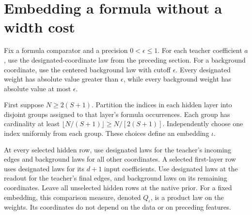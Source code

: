 \section{Embedding a formula without a width cost}
\label{sec:embedding}
Fix a formula comparator and a precision $0<\epsilon\le1$. For each teacher coefficient $a$, use the designated-coordinate law from the preceding section. For a background coordinate, use the centered background law with cutoff $\epsilon$. Every designated weight has absolute value greater than $\epsilon$, while every background weight has absolute value at most $\epsilon$.

First suppose $N\ge2(S+1)$. Partition the indices in each hidden layer into disjoint groups assigned to that layer's formula occurrences. Each group has cardinality at least
$\lfloor N/(S+1)\rfloor\ge N/[2(S+1)]$. Independently choose one index uniformly from each group. These choices define an embedding $\iota$.

At every selected hidden row, use designated laws for the teacher's incoming edges and background laws for all other coordinates. A selected first-layer row uses designated laws for its $d+1$ input coefficients. Use designated laws at the readout for the teacher's final edges, and background laws on its remaining coordinates. Leave all unselected hidden rows at the native prior. For a fixed embedding, this comparison measure, denoted $Q_\iota$, is a product law on the weights. Its coordinates do not depend on the data or on preceding features.

